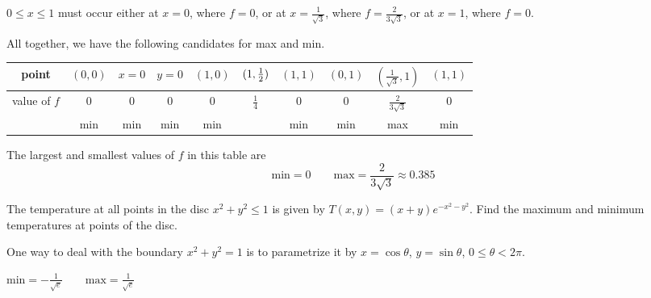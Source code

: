 \begin{solution}
\begin{itemize}
$0\le x\le 1$ must occur either at $x=0$, where $f=0$, or 
at $x=\frac{1}{\sqrt{3}}$, where $f=\frac{2}{3\sqrt{3}}$, 
or at $x=1$, where $f=0$.
\end{itemize}
All together, we have the following candidates for max and min.
\begin{center}
\renewcommand{\arraystretch}{1.3}
     \begin{tabular}{|c|c|c|c|c|c|c|c|c|c|}
     \hline
       point
       &$(0,0)$
       &$x=0$                    %
       &$y=0$                    %
       &$(1,0)$
       &$(1,\tfrac{1}{2})$
       &$(1,1)$
       &$(0,1)$
       &$(\frac{1}{\sqrt{3}},1)$
       &$(1,1)$ \\ \hline
       value of $f$
       &$0$
       &$0$
       &$0$
       &$0$
       &$\frac{1}{4}$
       &$0$
       &$0$
       &$\frac{2}{3\sqrt{3}}$
       &$0$ \\ \hline
       &min 
       &min    
       &min  
       &min  
       &  
       &min 
       &min
       &max
       &min \\ \hline
     \end{tabular}
\renewcommand{\arraystretch}{1.0}
\end{center}
The largest and smallest values of $f$ in this table are
\begin{equation*}
\text{min}=0\qquad
\text{max}=\frac{2}{3\sqrt{3}}\approx0.385
\end{equation*}
\end{solution}

\begin{question}
The temperature at all points in the disc $x^2+y^2\le 1$ is given by
$T(x,y)=(x+y)e^{-x^2-y^2}$. Find the maximum and minimum temperatures
at points of the disc.
\end{question}

\begin{hint}
One way to deal with the boundary $x^2+y^2=1$ is to parametrize
it by $x=\cos\theta$, $y=\sin\theta$, $0\le\theta<2\pi$.
\end{hint}

\begin{answer}
$
\text{min}=-\frac{1}{\sqrt{e}}\qquad
\text{max}=\frac{1}{\sqrt{e}}
$
\end{answer}

